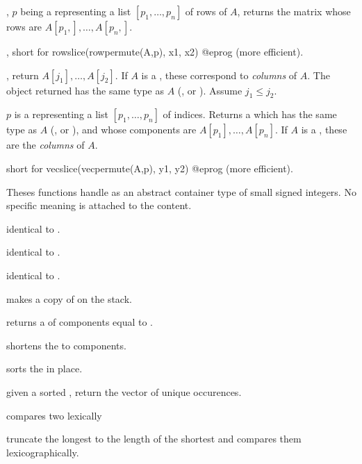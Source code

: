 , $p$ being a 
representing a list $[p_1,\dots,p_n]$ of rows of  $A$, returns the
matrix whose rows are $A[p_1,],\dots, A[p_n,]$.

, short for
\bprog
  rowslice(rowpermute(A,p), x1, x2)
@eprog\noindent
(more efficient).

, return $A[j_1], \dots,
A[j_2]$. If $A$ is a , these correspond to \emph{columns} of $A$.
The object returned has the same type as $A$ (,  or
). Assume $j_1 \leq j_2$.

 $p$ is a  representing
a list $[p_1,\dots,p_n]$ of indices. Returns a  which has the same
type as $A$ (,  or ), and whose components
are $A[p_1],\dots,A[p_n]$. If $A$ is a , these are the
\emph{columns} of $A$.

 short for 
\bprog
  vecslice(vecpermute(A,p), y1, y2)
@eprog\noindent
(more efficient).

Theses functions handle  as an abstract container type
of small signed integers. No specific meaning is attached to the content.

 identical to .

 identical to .

 identical to .

 makes a copy of  on the stack.

 returns a 
of  components equal to .

 shortens the  
to  components.

 sorts the   in place.

 given a sorted  , return
the vector of unique occurences.

 compares two  lexically

 truncate the longest 
to the length of the shortest and compares them lexicographically.

